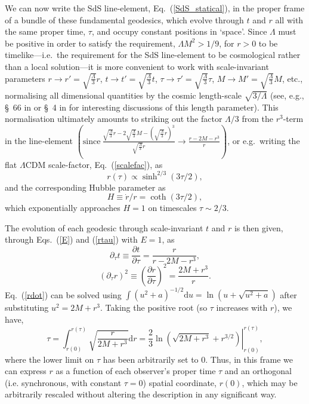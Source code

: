 \documentclass[11pt]{article}
\begin{document}
\begin{appendix}
We can now write the SdS line-element, Eq.~(\ref{SdS_statical}), in the proper frame of a bundle of these fundamental geodesics, which evolve through $t$ and $r$ all with the same proper time, $\tau$, and occupy constant positions in `space'. Since $\Lambda$ must be positive in order to satisfy the requirement, ${\Lambda}M^2>1/9$, for $r>0$ to be timelike---i.e.\ the requirement for the SdS line-element to be cosmological rather than a local solution---it is more convenient to work with scale-invariant parameters $r\rightarrow{r'}=\sqrt{\frac{\Lambda}{3}}r$, $t\rightarrow{t'}=\sqrt{\frac{\Lambda}{3}}t$, $\tau\rightarrow{\tau'}=\sqrt{\frac{\Lambda}{3}}\tau$, $M\rightarrow{M'}=\sqrt{\frac{\Lambda}{3}}M$, etc., normalising all dimensional quantities by the cosmic length-scale $\sqrt{3/\Lambda}$ (see, e.g., \S~{66} in \cite{Eddington1923} or \S~{4} in \cite{Dyson1972} for interesting discussions of this length parameter). This normalisation ultimately amounts to striking out the factor $\Lambda/3$ from the $r^3$-term in the line-element $\left(\mathrm{since}\ \frac{\sqrt{\frac{\Lambda}{3}}r-2\sqrt{\frac{\Lambda}{3}}M-\left(\sqrt{\frac{\Lambda}{3}}r\right)^3}{\sqrt{\frac{\Lambda}{3}}r}\rightarrow\frac{r-2M-r^3}{r}\right)$, or e.g.\ writing the flat $\Lambda$CDM scale-factor, Eq.~(\ref{scalefac}), as
\begin{equation}
r(\tau)\propto\sinh^{2/3}\left(3\tau/2\right),\label{scalefac_scaleinvtau}
\end{equation}
and the corresponding Hubble parameter as
\begin{equation}
H\equiv\dot{r}/r=\coth(3\tau/2),\label{Hubble}
\end{equation}
which exponentially approaches $H=1$ on timescales $\tau\sim2/3$.

The evolution of each geodesic through scale-invariant $t$ and $r$ is then given, through Eqs.~(\ref{E}) and (\ref{rtau}) with $E=1$, as 
\begin{equation}
\partial_{\tau}{t}\equiv\frac{\partial{t}}{\partial\tau}=\frac{r}{r-2M-r^3},\label{tdot}
\end{equation}
\begin{equation}
(\partial_{\tau}r)^2\equiv\left(\frac{\partial{r}}{\partial\tau}\right)^2=\frac{2M+r^3}{r}.\label{rdot}
\end{equation} 
Eq.~(\ref{rdot}) can be solved using $\int\left(u^2+a\right)^{-1/2}\mathrm{d}u=\ln\left(u+\sqrt{u^2+a}\right)$ after substituting $u^2=2M+r^3$. Taking the positive root (so $\tau$ increases with $r$), we have,
\begin{equation}
\tau=\int^{r(\tau)}_{r(0)}\sqrt{\frac{r}{2M+r^3}}\mathrm{d}r=\left.\frac{2}{3}\ln\left(\sqrt{2M+r^3}+r^{3/2}\right)\right|^{r(\tau)}_{r(0)},\label{t_int}
\end{equation}
where the lower limit on $\tau$ has been arbitrarily set to 0. Thus, in this frame we can express $r$ as a function of each observer's proper time $\tau$ and an orthogonal (i.e. synchronous, with constant $\tau=0$) spatial coordinate, $r(0)$, which may be arbitrarily rescaled without altering the description in any significant way.


\end{appendix}
\end{document}
